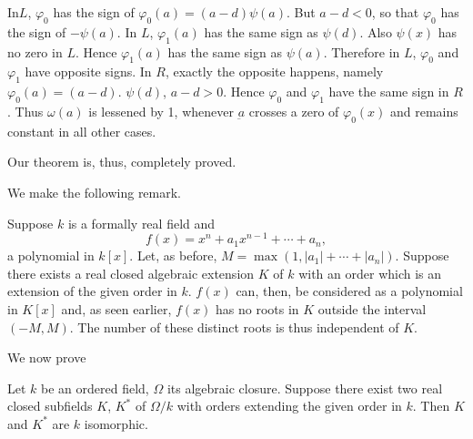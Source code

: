 In\pageoriginale $L$, $\varphi_0$ has the sign of $\varphi_0(a) = (a-d) \psi
(a)$. But $a-d<0$, so that $\varphi_0$ has the sign of $-\psi(a)$. In
$L$, $\varphi_1(a)$ has the same sign as $\psi(d)$. Also $\psi(x)$ has
no zero in $L$. Hence $\varphi_1(a)$ has the same sign as
$\psi(a)$. Therefore in $L$, $\varphi_0$ and $\varphi_1$ have opposite
signs. In $R$, exactly the opposite happens, namely $\varphi_0(a) =
(a-d)$. $\psi(d)$, $a-d>0$. Hence $\varphi_0$ and $\varphi_1$ have the
same sign in $R$. Thus $\omega(a)$ is lessened by 1, whenever
$\underbar{a}$ crosses a zero of $\varphi_0(x)$ and remains constant
in all other cases.

Our theorem is, thus, completely proved.

We make the following remark.

\begin{remark*}
Suppose $k$ is a formally real field and 
$$
f(x) = x^n + a_1 x^{n-1} + \cdots + a_n,
$$
a polynomial in $k[x]$. Let, as before, $M = \max (1, |a_1| + \cdots +
|a_n|)$. Suppose there exists a real closed algebraic extension $K$ of
$k$ with an order which is an extension of the given order in
$k$. $f(x)$ can, then, be considered as a polynomial in $K[x]$ and, as
seen earlier, $f(x)$ has no roots in $K$ outside the interval $(-M,
M)$. The number of these distinct roots is thus independent of $K$.

We now prove
\end{remark*}

\begin{thm}\label{chap7:thm7}%
Let $k$ be an ordered field, $\Omega$ its algebraic closure. Suppose
there exist two real closed subfields $K$, $K^{\ast}$ of $\Omega/k$
with orders extending the given order in $k$. Then $K$ and $K^{\ast}$
are $k$ isomorphic.
\end{thm}

